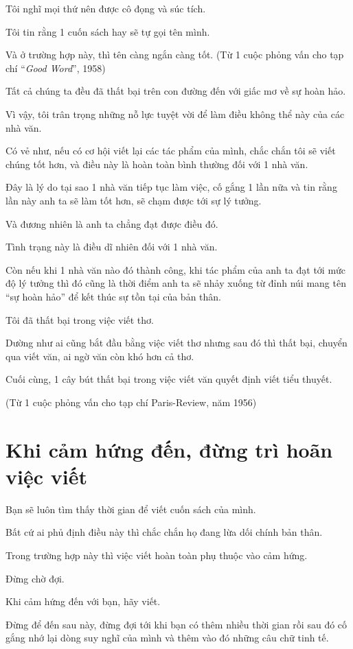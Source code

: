\documentclass{book}
\numberwithin{equation}{section}
\begin{document}
Tôi nghĩ mọi thứ nên được cô đọng và súc tích.

Tôi tin rằng 1 cuốn sách hay sẽ tự gọi tên mình.

Và ở trường hợp này, thì tên càng ngắn càng tốt. (Từ 1 cuộc phỏng vấn cho tạp chí ``\textit{Good Word}'', 1958)

%
Tất cả chúng ta đều đã thất bại trên con đường đến với giấc mơ về sự hoàn hảo.

Vì vậy, tôi trân trọng những nỗ lực tuyệt vời để làm điều không thể này của các nhà văn.

Có vẻ như, nếu có cơ hội viết lại các tác phẩm của mình, chắc chắn tôi sẽ viết chúng tốt hơn, và điều này là hoàn toàn bình thường đối với 1 nhà văn.

Đây là lý do tại sao 1 nhà văn tiếp tục làm việc, cố gắng 1 lần nữa và tin rằng lần này anh ta sẽ làm tốt hơn, sẽ chạm được tới sự lý tưởng.

Và đương nhiên là anh ta chẳng đạt được điều đó.

Tình trạng này là điều dĩ nhiên đối với 1 nhà văn.

Còn nếu khi 1 nhà văn nào đó thành công, khi tác phẩm của anh ta đạt tới mức độ lý tưởng thì đó cũng là thời điểm anh ta sẽ nhảy xuống từ đỉnh núi mang tên ``sự hoàn hảo'' để kết thúc sự tồn tại của bản thân.

Tôi đã thất bại trong việc viết thơ.

Dường như ai cũng bắt đầu bằng việc viết thơ nhưng sau đó thì thất bại, chuyển qua viết văn, ai ngờ văn còn khó hơn cả thơ.

Cuối cùng, 1 cây bút thất bại trong việc viết văn quyết định viết tiểu thuyết.

(Từ 1 cuộc phỏng vấn cho tạp chí Paris-Review, năm 1956)

\section{Khi cảm hứng đến, đừng trì hoãn việc viết}
Bạn sẽ luôn tìm thấy thời gian để viết cuốn sách của mình.

Bất cứ ai phủ định điều này thì chắc chắn họ đang lừa dối chính bản thân.

Trong trường hợp này thì việc viết hoàn toàn phụ thuộc vào cảm hứng.

Đừng chờ đợi.

Khi cảm hứng đến với bạn, hãy viết.

Đừng để đến sau này, đừng đợi tới khi bạn có thêm nhiều thời gian rồi sau đó cố gắng nhớ lại dòng suy nghĩ của mình và thêm vào đó những câu chữ tinh tế.
\end{document}
